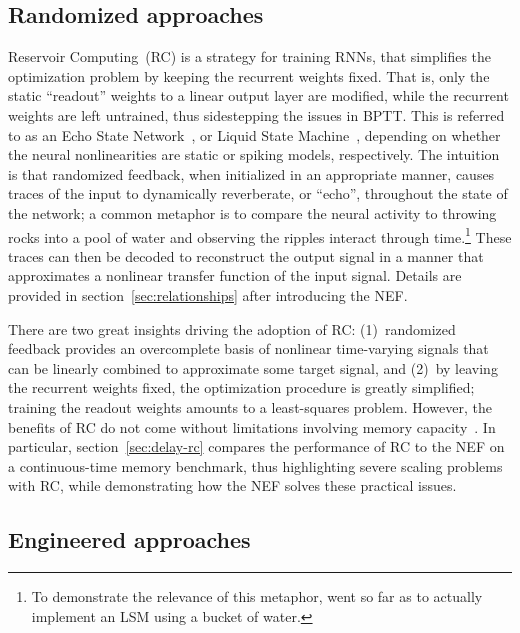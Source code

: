 \subsection{Randomized approaches}

Reservoir Computing~(RC) is a strategy for training RNNs, that simplifies the optimization problem by keeping the recurrent weights fixed.
That is, only the static ``readout'' weights to a linear output layer are modified, while the recurrent weights are left untrained, thus sidestepping the issues in BPTT.
This is referred to as an Echo State Network~\citep[ESN;][]{jaeger2001echo}, or Liquid State Machine~\citep[LSM;][]{maass2002real}, depending on whether the neural nonlinearities are static or spiking models, respectively.
The intuition is that randomized feedback, when initialized in an appropriate manner, causes traces of the input to dynamically reverberate, or ``echo'', throughout the state of the network; a common metaphor is to compare the neural activity to throwing rocks into a pool of water and observing the ripples interact through time.\footnote{To demonstrate the relevance of this metaphor, \citet{fernando2003pattern} went so far as to actually implement an LSM using a bucket of water.}
These traces can then be decoded to reconstruct the output signal in a manner that approximates a nonlinear transfer function of the input signal.
Details are provided in section~\ref{sec:relationships} after introducing the NEF.

There are two great insights driving the adoption of RC: (1)~randomized feedback provides an overcomplete basis of nonlinear time-varying signals that can be linearly combined to approximate some target signal, and (2)~by leaving the recurrent weights fixed, the optimization procedure is greatly simplified; training the readout weights amounts to a least-squares problem.
However, the benefits of RC do not come without limitations involving memory capacity~\citep{wallace2013randomly}.
In particular, section~\ref{sec:delay-rc} compares the performance of RC to the NEF on a continuous-time memory benchmark, thus highlighting severe scaling problems with RC, while demonstrating how the NEF solves these practical issues.

\subsection{Engineered approaches}
\label{sec:engineered-approaches}


